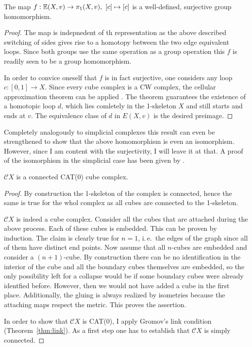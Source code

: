 \begin{lemma}
  The map \(f: \mathbb{E}(X,v) \to \pi_1(X,v),\ [c] \mapsto [c]\) is a well-defined, surjective group homomorphism.
\end{lemma}

\begin{proof}
  The map is indepnedent of th representation as the above described switching of sides gives rise to a homotopy between the two edge equivalent loops. Since both groups use the same operation as a group operation this \(f\) is readily seen to be a group homomorphism.

  In order to convice oneself that \(f\) is in fact surjective, one considers any loop \(c\colon [0,1] \to X\). Since every cube complex is a CW complex, the cellular approximation theorem can be applied . The theorem guarantees the existence of a homotopic loop \(d\), which lies comletely in the 1-skeleton \(X\) and still starts and ends at \(v\). The equivalence class of \(d\) in \(E(X,v)\) is the desired preimage.
\end{proof}

\begin{rem}
  Completely analogously to simplicial complexes this result can even be strengthened to show that the above homomorphism is even an isomorphism. However, since I am content with the surjectivity, I will leave it at that. A proof of the isomorphism in the simplicial case has been given by \textcite[Ch.\ 4.4]{Singer}.
\end{rem}

\begin{thm}
  \(\mathcal{C}X\) is a connected CAT(0) cube complex.
\end{thm}

\begin{proof}
  By construction the 1-skeleton of the complex is connected, hence the same is true for the whol complex as all cubes are connected to the 1-skeleton.
  
  \(\mathcal{C}X\) is indeed a cube complex. Consider all the cubes that are attached during the above process. Each of these cubes is embedded. This can be proven by induction. The claim is clearly true for \(n = 1\), i.\,e.\ the edges of the graph since all of them have distinct end points. Now assume that all \(n\)-cubes are embedded and consider a \((n+1)\)-cube. By construction there can be no identification in the interior of the cube and all the boundary cubes themselves are embedded, so the only possibility left for a collapse would be if some boundary cubes were already identfied before. However, then we would not have added a cube in the first place. Additionally, the gluing is always realized by isometries because the attaching maps respect the metric. This proves the assertion.

  In order to show that \(\mathcal{C}X\) is CAT(0), I apply Gromov's link condition (Theorem~\ref{thm:link}). As a first step one has to establish that \(\mathcal{C}X\) is simply connected. 
\end{proof}

